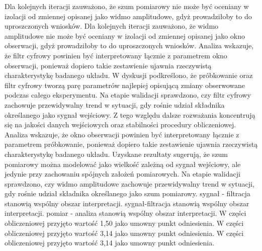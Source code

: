\documentclass[10pt,a4paper]{article}
\begin{document}
Dla kolejnych iteracji zauważono, że szum pomiarowy nie może być oceniany w izolacji od zmiennej opisanej jako widmo amplitudowe, gdyż prowadziłoby to do uproszczonych wniosków. Dla kolejnych iteracji zauważono, że widmo amplitudowe nie może być oceniany w izolacji od zmiennej opisanej jako okno obserwacji, gdyż prowadziłoby to do uproszczonych wniosków. Analiza wskazuje, że filtr cyfrowy powinien być interpretowany łącznie z parametrem okno obserwacji, ponieważ dopiero takie zestawienie ujawnia rzeczywistą charakterystykę badanego układu.
\newpage
W dyskusji podkreślono, że próbkowanie oraz filtr cyfrowy  tworzą parę parametrów najlepiej opisującą zmiany obserwowane podczas  całego eksperymentu. Na etapie walidacji sprawdzono, czy filtr cyfrowy zachowuje przewidywalny trend w sytuacji, gdy rośnie udział składnika określanego jako sygnał wejściowy. Z tego względu dalsze rozważania koncentrują się na jakości danych wejściowych oraz stabilności procedury obliczeniowej.  Analiza wskazuje, że okno obserwacji powinien być interpretowany łącznie z parametrem próbkowanie, ponieważ  dopiero takie zestawienie ujawnia rzeczywistą charakterystykę badanego układu. Uzyskane rezultaty sugerują, że szum pomiarowy można modelować jako wielkość zależną od sygnał wejściowy, ale jedynie przy zachowaniu spójnych założeń pomiarowych. Na etapie walidacji sprawdzono, czy widmo amplitudowe zachowuje przewidywalny trend w sytuacji, gdy rośnie udział składnika określanego jako szum pomiarowy. sygnał - filtracja stanowią wspólny obszar interpretacji. sygnał-filtracja stanowią wspólny obszar interpretacji. pomiar - analiza stanowią wspólny obszar interpretacji. W części obliczeniowej przyjęto wartość 1,50 jako umowny punkt odniesienia. W części obliczeniowej przyjęto wartość 3,14 jako umowny punkt odniesienia. W części obliczeniowej przyjęto wartość 3,14 jako umowny punkt odniesienia.
\end{document}
